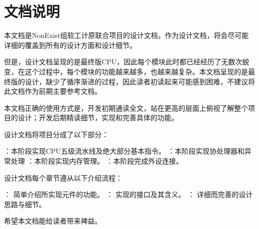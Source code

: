 \chapter{文档说明}

本文档是NonExist组软工计原联合项目的设计文档，作为设计文档，将会尽可能详细的覆盖到所有的设计方面和设计细节。

但是，设计文档呈现的是最终版CPU，因此每个模块此时都已经经历了无数次蜕变，在这个过程中，每个模块的功能越来越多，也越来越复杂。本文档呈现的是最终版的设计，缺少了循序渐进的过程，因此读者初读起来可能感到困难，不建议将此文档作为前期主要参考文档。

本文档正确的使用方式是，开发初期通读全文，站在更高的层面上俯视了解整个项目的设计；开发后期精读细节，实现和完善具体的功能。

设计文档将项目分成了以下部分：

    \begin{enumerate}
        ：本阶段实现CPU五级流水线及绝大部分基本指令。
        ：本阶段实现协处理器和异常处理
        ：本阶段实现内存管理。
        ：本阶段完成外设连接。
    \end{enumerate}


设计文档每个章节遵从以下介绍流程：

    \begin{enumerate}
        ： 简单介绍所实现元件的功能。
        ： 实现的接口及其含义。
        ： 详细而完善的设计思路与细节。
    \end{enumerate}

希望本文档能给读者带来裨益。

